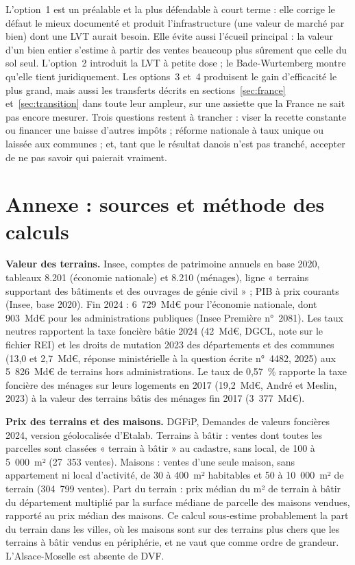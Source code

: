\documentclass[11pt,a4paper]{article}
\begin{document}
L'option~1 est un préalable et la plus défendable à court terme : elle corrige le défaut le mieux
documenté et produit l'infrastructure (une valeur de marché par bien) dont une LVT aurait besoin.
Elle évite aussi l'écueil principal : la valeur d'un bien entier s'estime à partir des ventes
beaucoup plus sûrement que celle du sol seul.
L'option~2 introduit la LVT à petite dose ; le Bade-Wurtemberg montre qu'elle tient juridiquement. Les options~3 et~4 produisent le gain
d'efficacité le plus grand, mais aussi les transferts décrits en sections~\ref{sec:france}
et~\ref{sec:transition} dans toute leur ampleur, sur une assiette que la France ne sait pas encore
mesurer. Trois questions restent à trancher : viser la recette constante ou financer une baisse
d'autres impôts ; réforme nationale à taux unique ou laissée aux communes ; et, tant que le résultat
danois n'est pas tranché, accepter de ne pas savoir qui paierait vraiment.

\appendix
\section*{Annexe : sources et méthode des calculs}

\small
\textbf{Valeur des terrains.} Insee, comptes de patrimoine annuels en base 2020, tableaux 8.201
(économie nationale) et 8.210 (ménages), ligne « terrains supportant des bâtiments et des ouvrages
de génie civil » ; PIB à prix courants (Insee, base 2020). Fin 2024 : 6~729~Md€ pour l'économie
nationale, dont 903~Md€ pour les administrations publiques (Insee Première n°~2081). Les taux
neutres rapportent la taxe foncière bâtie 2024 (42~Md€, DGCL, note sur le fichier REI) et les
droits de mutation 2023 des départements et des communes (13,0 et 2,7~Md€, réponse ministérielle à
la question écrite n°~4482, 2025) aux 5~826~Md€ de terrains hors administrations. Le taux de 0,57~\%
rapporte la taxe foncière des ménages sur leurs logements en 2017 (19,2~Md€, André et Meslin,
2023) à la valeur des terrains bâtis des ménages fin 2017 (3~377~Md€).

\textbf{Prix des terrains et des maisons.} DGFiP, Demandes de valeurs foncières 2024, version
géolocalisée d'Etalab. Terrains à bâtir : ventes dont toutes les parcelles sont classées « terrain
à bâtir » au cadastre, sans local, de 100 à 5~000~m² (27~353 ventes). Maisons : ventes d'une seule
maison, sans appartement ni local d'activité, de 30 à 400~m² habitables et 50 à 10~000~m² de
terrain (304~799 ventes). Part du terrain : prix médian du m² de terrain à bâtir du département
multiplié par la surface médiane de parcelle des maisons vendues, rapporté au prix médian des
maisons. Ce calcul sous-estime probablement la part du terrain dans les villes, où les maisons
sont sur des terrains plus chers que les terrains à bâtir vendus en périphérie, et ne vaut que
comme ordre de grandeur. L'Alsace-Moselle est absente de DVF.
\end{document}
